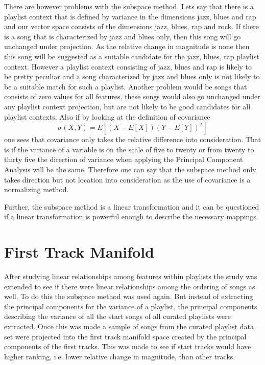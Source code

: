 \documentclass[a4paper,11pt]{kth-mag}
\begin{document}
There are however problems with the subspace method. Lets say that there is a playlist context that is defined by variance in the dimensions jazz, blues and rap and our vector space consists of the dimensions jazz, blues, rap and rock. If there is a song that is characterized by jazz and blues only, then this song will go unchanged under projection. As the relative change in magnitude is none then this song will be suggested as a suitable candidate for the jazz, blues, rap playlist context. However a playlist context consisting of jazz, blues and rap is likely to be pretty peculiar and a song characterized by jazz and blues only is not likely to be a suitable match for such a playlist. Another problem would be songs that consists of zero values for all features, these songs would also go unchanged under any playlist context projection, but are not likely to be good candidates for all playlist contexts. Also if by looking at the definition of covariance 
\begin{equation}
\sigma(X, Y) = E[(X - E[X]) (Y - E[Y])^T]
\end{equation} 
one sees that covariance only takes the relative difference into consideration. That is if the variance of a variable is on the scale of five to twenty or from twenty to thirty five the direction of variance when applying the Principal Component Analysis will be the same. Therefore one can say that the subspace method only takes direction but not location into consideration as the use of covariance is a normalizing method.

Further, the subspace method is a linear transformation and it can be questioned if a linear transformation is powerful enough to describe the necessary mappings.

\section{First Track Manifold}
After studying linear relationships among features within playlists the study was extended to see if there were linear relationships among the ordering of songs as well. To do this the subspace method was used again. But instead of extracting the principal components for the variance of a playlist, the principal components describing the variance of all the start songs of all curated playlists were extracted. Once this was made a sample of songs from the curated playlist data set were projected into the first track manifold space created by the principal components of the first tracks. This was made to see if start tracks would have higher ranking, i.e. lower relative change in magnitude, than other tracks.
\end{document}
